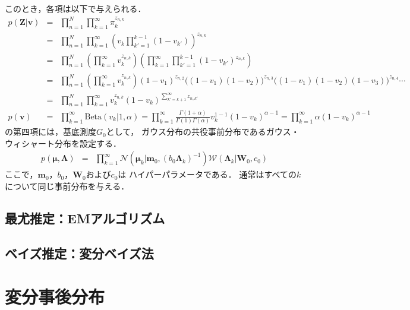 このとき，各項は以下で与えられる．
\begin{eqnarray}
 p(\bm{Z}|\bm{v}) 
  &=& \prod_{n=1}^{N} \prod_{k=1}^{\infty}  
      \pi_{k}^{z_{n,k}} 
      \nonumber \\ 
  &=& \prod_{n=1}^{N} \prod_{k=1}^{\infty}
      \left(v_k \prod_{k'=1}^{k-1} (1 - v_{k'})\right)^{z_{n,k}}
      \nonumber \\ 
  &=& \prod_{n=1}^{N} 
      \left(\prod_{k=1}^{\infty} v_k^{z_{n,k}}\right)
      \left(\prod_{k=1}^{\infty} \prod_{k'=1}^{k-1} (1 - v_{k'})^{z_{n,k}}\right)
      \nonumber \\ 
  &=& \prod_{n=1}^{N} 
      \left(\prod_{k=1}^{\infty} v_k^{z_{n,k}}\right)
      (1 - v_1)^{z_{n,2}} 
      \bigl((1 - v_1)(1 - v_2)\bigr)^{z_{n,3}}
      \bigl((1 - v_1)(1 - v_2)(1 - v_3)\bigr)^{z_{n,4}}
      \cdots
      \nonumber \\
  &=& \prod_{n=1}^{N} 
      \prod_{k=1}^{\infty}
      v_k^{z_{n,k}} 
      (1 - v_k)^{\sum_{k' = k+1}^{\infty} z_{n,k'}}
      \label{eq:pzv}
      \\
 p(\bm{v}) 
  &=& \prod_{k=1}^{\infty} \mbox{Beta}(v_k|1, \alpha)
   =  \prod_{k=1}^{\infty} \frac{\Gamma(1 + \alpha)}
      {\Gamma(1)\Gamma(\alpha)} v_k^{1-1} (1 - v_k)^{\alpha - 1}
   =  \prod_{k=1}^{\infty} \alpha (1 - v_k)^{\alpha - 1}
  \label{eq:pv}
\end{eqnarray}
の第四項には，基底測度$G_0$として，
ガウス分布の共役事前分布であるガウス・ウィシャート分布を設定する．
\begin{eqnarray}
 p(\bm\mu,\bm\Lambda)
  &=&
  \prod_{k=1}^{\infty}
  \mathcal{N}\left(\bm\mu_{k}\big|\bm{m}_0,(b_0\bm\Lambda_{k})^{-1}\right)
  \mathcal{W}\left(\bm\Lambda_{k}\big|\bm{W}_0,c_0\right)
  \label{eq:pmu}
\end{eqnarray}
ここで，$\bm{m}_0$，$b_0$，$\bm{W}_0$および$c_0$は
ハイパーパラメータである．
通常はすべての$k$について同じ事前分布を与える．

\subsection{最尤推定：EMアルゴリズム}

\subsection{ベイズ推定：変分ベイズ法}

\section{変分事後分布}

